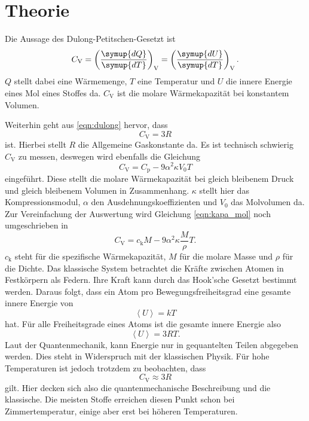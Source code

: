 \section{Theorie}
\label{sec:Theorie}

Die Aussage des Dulong-Petitschen-Gesetzt ist
\begin{equation}
    C_\text{V} = \left ( \frac{\symup{dQ}}{\symup{dT}} \right )_\text{V} = \left ( \frac{\symup{dU}}{\symup{dT}} \right )_\text{V}  .
    \label{eqn:dulong}
\end{equation}
$Q$ stellt dabei eine Wärmemenge, $T$ eine Temperatur und $U$ die innere Energie eines Mol eines Stoffes da.
$C_\text{V}$ ist die molare Wärmekapazität bei konstantem Volumen.

Weiterhin geht aus \eqref{eqn:dulong} hervor, dass
\begin{equation}
    C_\text{V} = 3R
    \label{eqn:dulong_klassisch}
\end{equation}
ist. Hierbei stellt $R$ die Allgemeine Gaskonstante da.
Es ist technisch schwierig $C_\text{V}$ zu messen, deswegen wird ebenfalls die Gleichung
\begin{equation}
    C_\text{V} = C_\text{p} - 9 \alpha^2 \kappa V_0 T
    \label{eqn:kapa_mol}
\end{equation}
eingeführt.
Diese stellt die molare Wärmekapazität bei gleich bleibenem Druck und gleich bleibenem Volumen in Zusammenhang.
$\kappa$ stellt hier das Kompressionsmodul, $\alpha$ den Ausdehnungskoeffizienten und $V_0$ das Molvolumen da.
Zur Vereinfachung der Auswertung wird Gleichung \eqref{eqn:kapa_mol} noch umgeschrieben in
\begin{equation}
    C_\text{V} = c_\text{k} M - 9\alpha^2 \kappa \frac{M}{\rho}T.
    \label{eqn:waerme_vol}
\end{equation}
$c_\text{k}$ steht für die spezifische Wärmekapazität, $M$ für die molare Masse und $\rho$ für die Dichte.
Das klassische System betrachtet die Kräfte zwischen Atomen in Festkörpern als Federn.
Ihre Kraft kann durch das Hook'sche Gesetzt bestimmt werden.
Daraus folgt, dass ein Atom pro Bewegungsfreiheitsgrad eine gesamte innere Energie von
\begin{equation*}
    \left < U \right > = kT
\end{equation*}
hat.
Für alle Freiheitsgrade eines Atoms ist die gesamte innere Energie also
\begin{equation*}
    \left < U \right > = 3RT.
\end{equation*}
Laut der Quantenmechanik, kann Energie nur in gequantelten Teilen abgegeben werden.
Dies steht in Widerspruch mit der klassischen Physik.
Für hohe Temperaturen ist jedoch trotzdem zu beobachten, dass 
\begin{equation*}
    C_\text{V} \approx 3 R
\end{equation*}
gilt.
Hier decken sich also die quantenmechanische Beschreibung und die klassische.
Die meisten Stoffe erreichen diesen Punkt schon bei Zimmertemperatur, einige aber erst bei höheren Temperaturen.

